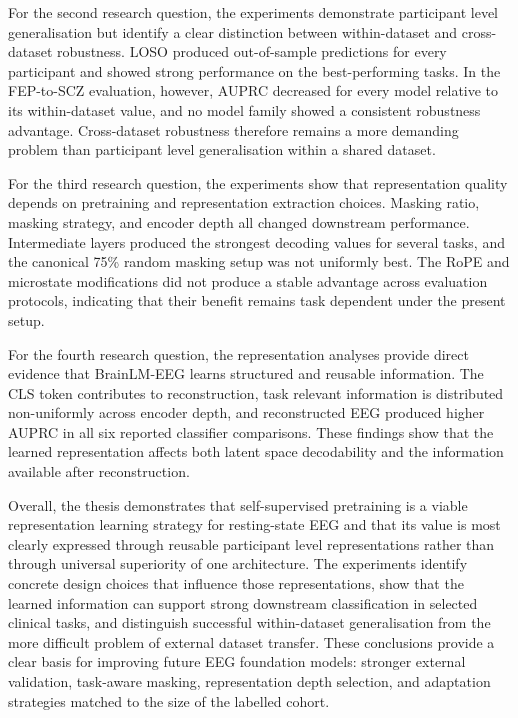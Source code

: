 For the second research question, the experiments demonstrate participant level generalisation but identify a clear distinction between within-dataset and cross-dataset robustness. LOSO produced out-of-sample predictions for every participant and showed strong performance on the best-performing tasks. In the FEP-to-SCZ evaluation, however, AUPRC decreased for every model relative to its within-dataset value, and no model family showed a consistent robustness advantage. Cross-dataset robustness therefore remains a more demanding problem than participant level generalisation within a shared dataset.

For the third research question, the experiments show that representation quality depends on pretraining and representation extraction choices. Masking ratio, masking strategy, and encoder depth all changed downstream performance. Intermediate layers produced the strongest decoding values for several tasks, and the canonical 75\% random masking setup was not uniformly best. The RoPE and microstate modifications did not produce a stable advantage across evaluation protocols, indicating that their benefit remains task dependent under the present setup.

For the fourth research question, the representation analyses provide direct evidence that BrainLM-EEG learns structured and reusable information. The CLS token contributes to reconstruction, task relevant information is distributed non-uniformly across encoder depth, and reconstructed EEG produced higher AUPRC in all six reported classifier comparisons. These findings show that the learned representation affects both latent space decodability and the information available after reconstruction.

Overall, the thesis demonstrates that self-supervised pretraining is a viable representation learning strategy for resting-state EEG and that its value is most clearly expressed through reusable participant level representations rather than through universal superiority of one architecture. The experiments identify concrete design choices that influence those representations, show that the learned information can support strong downstream classification in selected clinical tasks, and distinguish successful within-dataset generalisation from the more difficult problem of external dataset transfer. These conclusions provide a clear basis for improving future EEG foundation models: stronger external validation, task-aware masking, representation depth selection, and adaptation strategies matched to the size of the labelled cohort.
